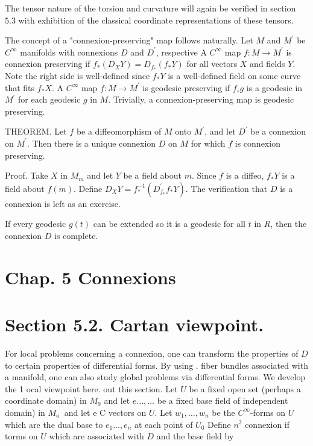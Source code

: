 \documentclass[10pt]{article}
\begin{document}
The tensor nature of the torsion and curvature will again be verified in section $5.3$ with exhibition of the classical coordinate representations of these tensors.

The concept of a "connexion-preserving" map follows naturally. Let $M$ and $M^{\prime}$ be $C^{\infty}$ manifolds with connexions $D$ and $D^{\prime}$, respective A $C^{\infty}$ map $f: M \rightarrow M^{\prime}$ is connexion preserving if $f_{*}\left(D_{X} Y\right)=D_{f_{*}}\left(f_{*} Y\right)$ for all vectors $X$ and fields $Y$. Note the right side is well-defined since $f_{*} Y$ is a well-defined field on some curve that fits $f_{*} X$. A $C^{\infty}$ map $f: M \rightarrow M^{\prime}$ is geodesic preserving if $f_{\circ} g$ is a geodesic in $M^{\prime}$ for each geodesic $g$ in $M$. Trivially, a connexion-preserving map is geodesic preserving.

THEOREM. Let $f$ be a diffeomorphism of $M$ onto $M^{\prime}$, and let $D^{\prime}$ be a connexion on $M^{\prime}$. Then there is a unique connexion $D$ on $M$ for which $f$ is connexion preserving.

Proof. Take $X$ in $M_{m}$ and let $Y$ be a field about $m$. Since $f$ is a diffeo, $f_{*} Y$ is a field about $f(m)$. Define $D_{X} Y=f_{*}^{-1}\left(D_{f_{*}}^{\prime} f_{*} Y\right)$. The verification that $D$ is a connexion is left as an exercise.

If every geodesic $g(t)$ can be extended so it is a geodesic for all $t$ in $R$, then the connexion $D$ is complete.

\section{Chap. 5 Connexions}
\section{Section 5.2. Cartan viewpoint.}
For local problems concerning a connexion, one can transform the properties of $D$ to certain properties of differential forms. By using . fiber bundles associated with a manifold, one can also study global problems via differential forms. We develop the 1 ocal viewpoint here. out this section. Let $U$ be a fixed open set (perhaps a coordinate domain) in $M_{9}$ and let $e \ldots, \ldots$ be a fixed base field of independent domain) in $M_{\text {o }}$ and let e C vectors on $U$. Let $w_{1}, \ldots, w_{n}$ be the $C^{\infty}$-forms on $U$ which are the dual base to $e_{1} \ldots, e_{n}$ at each point of $U_{0}$ Define $n^{2}$ connexion if torms on $U$ which are associated with $D$ and the base field by
\end{document}
